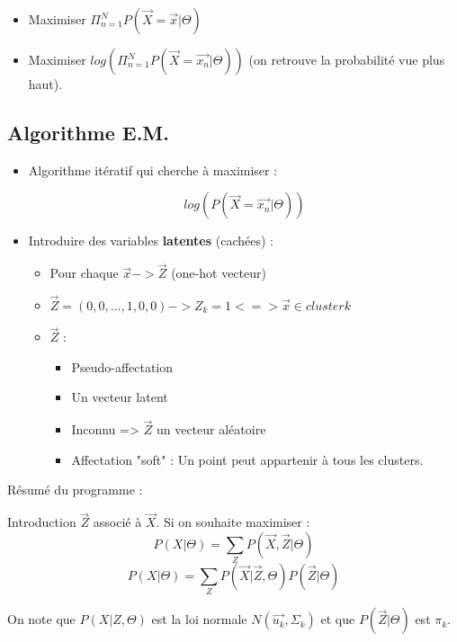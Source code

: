 \documentclass{article}
\begin{document}
\begin{itemize}
\item Maximiser $ \Pi_{n=1}^N  P(\vec{X} = \vec{x} | \Theta)$

\item Maximiser $log(\Pi_{n=1}^N P(\vec{X} = \vec{x_n} | \Theta))$ (on retrouve la probabilité vue plus haut).

\end{itemize}

\subsection{Algorithme E.M.}

\begin{itemize}

\item Algorithme itératif qui cherche à maximiser : 

\[ log(P(\vec{X} = \vec{x_n} | \Theta))  \]

\item Introduire des variables \textbf{latentes} (cachées) : 

\begin{itemize}

\item Pour chaque $\vec{x} -> \vec{Z}$ (one-hot vecteur)
\item $\vec{Z} = (0, 0, ..., 1, 0, 0) -> Z_k = 1 <=> \vec{x} \in cluster k$
\item $\vec{Z}$ : 
\begin{itemize}
\item Pseudo-affectation
\item Un vecteur latent
\item Inconnu => $\vec{Z}$ un vecteur aléatoire
\item Affectation "soft" : Un point peut appartenir à tous les clusters.
\end{itemize}
\end{itemize}
\end{itemize}

Résumé du programme : 

Introduction $\vec{Z}$ associé à $\vec{X}$. Si on souhaite maximiser : 
\[ P(X | \Theta) = \sum_Z P(\vec{X}, \vec{Z} | \Theta) \]
\[ P(X | \Theta) = \sum_Z P(\vec{X} | \vec{Z}, \Theta) P(\vec{Z} | \Theta) \]

On note que $P(X | Z, \Theta)$ est la loi normale $N(\vec{u_k}, \Sigma_k)$ et que $P(\vec{Z} | \Theta)$ est $\pi_k$.
\end{document}
